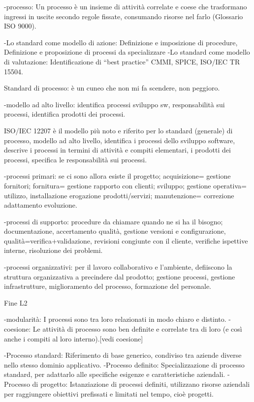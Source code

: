 \documentclass{report}
\begin{document}
-processo: Un processo è un insieme di attività correlate e coese che trasformano ingressi in uscite secondo regole fissate, consumando risorse nel farlo (Glossario ISO 9000).

-Lo standard come modello di azione: Definizione e imposizione di procedure, Definizione e proposizione di processi da specializzare
-Lo standard come modello di valutazione: Identificazione di “best practice” CMMI, SPICE, ISO/IEC TR 15504.

Standard di processo: è un cuneo che non mi fa scendere, non peggioro.


-modello ad alto livello: identifica processi sviluppo sw, responsabilità sui processi, identifica prodotti dei processi.

ISO/IEC 12207 è il modello più noto e riferito per lo standard (generale) di processo, modello ad alto livello, identifica i processi dello sviluppo software, descrive i processi in termini di attività e compiti elementari, i prodotti dei processi, specifica le responsabilità sui processi.

-processi primari: se ci sono allora esiste il progetto; acquisizione= gestione fornitori; fornitura= gestione rapporto con clienti; sviluppo; gestione operativa= utilizzo, installazione erogazione prodotti/servizi; manutenzione= correzione adattamento evoluzione.

-processi di supporto: procedure da chiamare quando  ne si ha il bisogno; documentazione, accertamento qualità, gestione versioni e configurazione, qualità=verifica+validazione, revisioni congiunte con il cliente, verifiche ispettive interne, risoluzione dei problemi.

-processi organizzativi: per il lavoro collaborativo e l'ambiente, defiiscono la struttura organizzativa a precindere dal prodotto; gestione processi, gestione infrastrutture, miglioramento del processo, formazione del personale.

Fine L2

-modularità: I processi sono tra loro relazionati in modo chiaro e distinto.
-coesione: Le attività di processo sono ben definite e correlate tra di loro (e così anche i compiti al loro interno).[vedi coesione]

-Processo standard: Riferimento di base generico, condiviso tra aziende diverse nello stesso dominio applicativo.
-Processo definito: Specializzazione di processo standard, per adattarlo alle specifiche esigenze e caratteristiche aziendali.
-Processo di progetto: Istanziazione di processi definiti, utilizzano risorse aziendali per raggiungere obiettivi prefissati e limitati nel tempo, cioè progetti.
\end{document}
